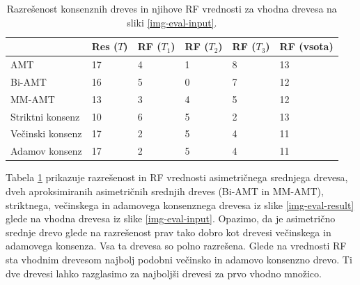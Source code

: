 \documentclass[a4paper, 12pt]{book}
\begin{document}
\begin{table}
	\begin{center}
	{\footnotesize
	\begin{tabular}{ l| l | l | l | l | l }
	~                & Res ($T$) & RF ($T_1$) & RF ($T_2$) & RF ($T_3$) & RF (vsota) \\ \hline
	AMT              & 17          & 4             & 1             & 8             & 13         \\ \hline
	Bi-AMT           & 16          & 5             & 0             & 7             & 12         \\ \hline
	MM-AMT           & 13          & 3             & 4             & 5             & 12         \\ \hline
	Striktni konsenz & 10          & 6             & 5             & 2             & 13         \\ \hline
	Večinski konsenz & 17          & 2             & 5             & 4             & 11         \\ \hline
	Adamov konsenz   & 17          & 2             & 5             & 4             & 11         \\ \hline
	\end{tabular}
	\caption{Razrešenost konsenznih dreves in njihove RF vrednosti za vhodna drevesa na sliki \ref{img-eval-input}.}
	}
	\label{table-eval-1}
	\end{center}		
\end{table}

Tabela \ref{table-eval-1} prikazuje razrešenost in RF vrednosti asimetričnega srednjega drevesa, dveh aproksimiranih asimetričnih srednjih dreves (Bi-AMT in MM-AMT), striktnega, večinskega in adamovega konsenznega drevesa iz slike \ref{img-eval-result} glede na vhodna drevesa iz slike \ref{img-eval-input}. Opazimo, da je asimetrično srednje drevo glede na razrešenost prav tako dobro kot drevesi večinskega in adamovega konsenza. Vsa ta drevesa so polno razrešena. Glede na vrednosti RF sta vhodnim drevesom najbolj podobni večinsko in adamovo konsenzno drevo. Ti dve drevesi lahko razglasimo za najboljši drevesi za prvo vhodno množico.
\end{document}
